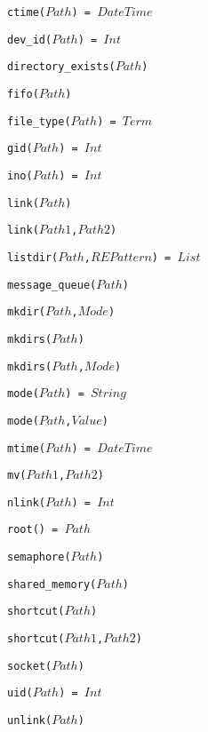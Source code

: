 \documentclass[10pt]{article}
\begin{document}
\begin{multicols}{2}
\begin{scriptsize}
\begin{itemize}
{\item \texttt{ctime($Path$) = $DateTime$}
\item \texttt{dev\_id($Path$) = $Int$}
\item \texttt{directory\_exists($Path$)}
\item \texttt{fifo($Path$)}
\item \texttt{file\_type($Path$) = $Term$}
\item \texttt{gid($Path$) = $Int$}
\item \texttt{ino($Path$) = $Int$}
\item \texttt{link($Path$)}
\item \texttt{link($Path1$,$Path2$)}
\item \texttt{listdir($Path$,$REPattern$) = $List$}
\item \texttt{message\_queue($Path$)}
\item \texttt{mkdir($Path$,$Mode$)}
\item \texttt{mkdirs($Path$)}
\item \texttt{mkdirs($Path$,$Mode$)}
\item \texttt{mode($Path$) = $String$}
\item \texttt{mode($Path$,$Value$)}
\item \texttt{mtime($Path$) = $DateTime$}
\item \texttt{mv($Path1$,$Path2$)}
\item \texttt{nlink($Path$) = $Int$}
\item \texttt{root() = $Path$}
\item \texttt{semaphore($Path$)}
\item \texttt{shared\_memory($Path$)}
\item \texttt{shortcut($Path$)}
\item \texttt{shortcut($Path1$,$Path2$)}
\item \texttt{socket($Path$)}
\item \texttt{uid($Path$) = $Int$}
\item \texttt{unlink($Path$)}
}
\end{itemize}
\end{scriptsize}

\end{multicols}
\end{document}

